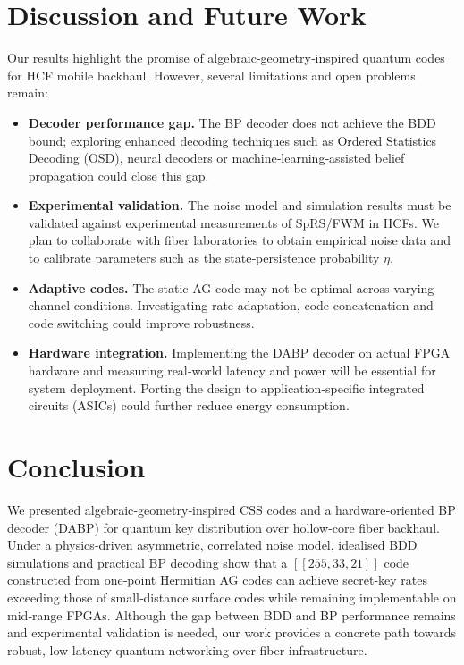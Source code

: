 \documentclass[conference]{IEEEtran}
\begin{document}
\section{Discussion and Future Work}

Our results highlight the promise of algebraic‑geometry‑inspired quantum codes for HCF mobile backhaul.  However, several limitations and open problems remain:

\begin{itemize}[leftmargin=*]
  \item \textbf{Decoder performance gap.}  The BP decoder does not achieve the BDD bound; exploring enhanced decoding techniques such as Ordered Statistics Decoding (OSD), neural decoders or machine‑learning‑assisted belief propagation could close this gap.
  \item \textbf{Experimental validation.}  The noise model and simulation results must be validated against experimental measurements of SpRS/FWM in HCFs.  We plan to collaborate with fiber laboratories to obtain empirical noise data and to calibrate parameters such as the state‑persistence probability $\eta$.
  \item \textbf{Adaptive codes.}  The static AG code may not be optimal across varying channel conditions.  Investigating rate‑adaptation, code concatenation and code switching could improve robustness.
  \item \textbf{Hardware integration.}  Implementing the DABP decoder on actual FPGA hardware and measuring real‑world latency and power will be essential for system deployment.  Porting the design to application‑specific integrated circuits (ASICs) could further reduce energy consumption.
\end{itemize}

\section{Conclusion}

We presented algebraic‑geometry‑inspired CSS codes and a hardware‑oriented BP decoder (DABP) for quantum key distribution over hollow‑core fiber backhaul.  Under a physics‑driven asymmetric, correlated noise model, idealised BDD simulations and practical BP decoding show that a $[[255,33,21]]$ code constructed from one‑point Hermitian AG codes can achieve secret‑key rates exceeding those of small‑distance surface codes while remaining implementable on mid‑range FPGAs.  Although the gap between BDD and BP performance remains and experimental validation is needed, our work provides a concrete path towards robust, low‑latency quantum networking over fiber infrastructure.



\end{document}
